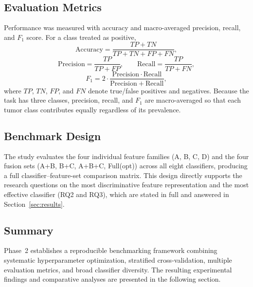 \subsection{Evaluation Metrics}
\label{sec:phase2_metrics}

Performance was measured with accuracy and macro-averaged precision, recall, and
$F_1$ score. For a class treated as positive,
\begin{equation}
\mathrm{Accuracy} = \frac{TP + TN}{TP + TN + FP + FN},
\end{equation}
\begin{equation}
\mathrm{Precision} = \frac{TP}{TP + FP}, \qquad
\mathrm{Recall} = \frac{TP}{TP + FN},
\end{equation}
\begin{equation}
F_1 = 2 \cdot \frac{\mathrm{Precision}\cdot \mathrm{Recall}}
{\mathrm{Precision} + \mathrm{Recall}},
\end{equation}
where $TP$, $TN$, $FP$, and $FN$ denote true/false positives and negatives.
Because the task has three classes, precision, recall, and $F_1$ are
macro-averaged so that each tumor class contributes equally regardless of its
prevalence.

\subsection{Benchmark Design}
\label{sec:phase2_design}

The study evaluates the four individual feature families (A, B, C, D) and the
four fusion sets (A+B, B+C, A+B+C, Full(opt)) across all eight classifiers,
producing a full classifier--feature-set comparison matrix. This design directly
supports the research questions on the most discriminative feature representation
and the most effective classifier (RQ2 and RQ3), which are stated in full and
answered in Section~\ref{sec:results}.

\subsection{Summary}
\label{sec:phase2_summary}

Phase~2 establishes a reproducible benchmarking framework combining systematic
hyperparameter optimization, stratified cross-validation, multiple evaluation
metrics, and broad classifier diversity. The resulting experimental findings and
comparative analyses are presented in the following section.
